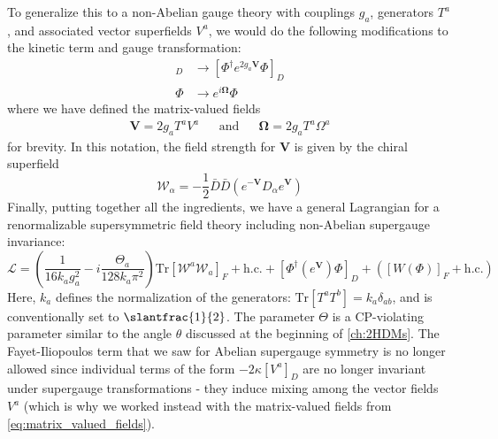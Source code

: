 To generalize this to a non-Abelian gauge theory with couplings $g_a$, generators $T^a$, and associated vector superfields $V^a$, we would do the following modifications to the kinetic term and gauge transformation:
\begin{align*}
  [\Phi^\dagger e^{2gqV}\Phi]_D&\rightarrow[\Phi^\dagger e^{2g_a\mathbf{V}}\Phi]_D\\
  \Phi&\rightarrow e^{i\textbf{Ω}}\Phi
\end{align*}
where we have defined the matrix-valued fields 
\begin{align}
  \mathbf{V} = 2g_aT^aV^a&&\text{and}&& \textbf{Ω} = 2g_aT^a\Omega^a
  \label{eq:matrix_valued_fields}
\end{align}
for brevity. In this notation, the field strength for \textbf{V} is given by the chiral superfield
\[\mathcal{W}_\alpha = -\frac{1}{2}\bar{D}\bar{D}\left(e^{-\mathbf{V}}D_\alpha e^{\mathbf{V}}\right)\]
Finally, putting together all the ingredients, we have a general Lagrangian for a renormalizable supersymmetric field theory including non-Abelian supergauge invariance:
\begin{equation*}
  \mathcal{L} = \left(\frac{1}{16k_ag_a^2}-i\frac{\Theta_a}{128k_a\pi^2}\right)\text{Tr}[\mathcal{W}^a\mathcal{W}_a]_F + \text{h.c.} + \left[\Phi^\dagger(e^{\mathbf{V}})\Phi\right]_D + \left([W(\Phi)]_F + \text{h.c.}\right)
\end{equation*}
Here, $k_a$ defines the normalization of the generators: $\text{Tr}[T^aT^b] = k_a\delta_{ab}$, and is conventionally set to $\slantfrac{1}{2}$. The parameter $\Theta$ is a CP-violating parameter similar to the angle $\theta$ discussed at the beginning of \autoref{ch:2HDMs}. The Fayet-Iliopoulos term that we saw for Abelian supergauge symmetry is no longer allowed since individual terms of the form $-2\kappa[V^a]_D$ are no longer invariant under supergauge transformations - they induce mixing among the vector fields $V^a$ (which is why we worked instead with the matrix-valued fields from \eqref{eq:matrix_valued_fields}).

